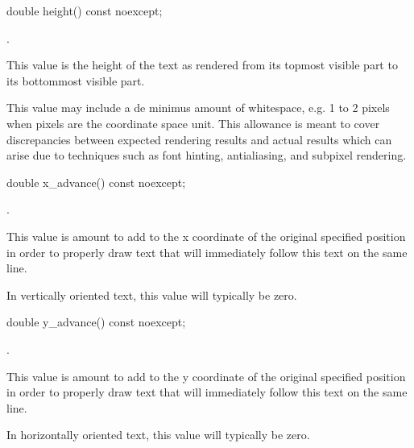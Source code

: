\begin{itemdecl}
    double height() const noexcept;
\end{itemdecl}
\begin{itemdescr}
	\pnum
	\returns
	.
	
	\pnum
	\remarks
	This value is the height of the text as rendered from its topmost visible part to its bottommost visible part.
	
	\pnum
	This value may include a de minimus amount of whitespace, e.g. 1 to 2 pixels when pixels are the coordinate space unit. This allowance is meant to cover discrepancies between expected rendering results and actual results which can arise due to techniques such as font hinting, antialiasing, and subpixel rendering.

\end{itemdescr}

\begin{itemdecl}
    double x_advance() const noexcept;
\end{itemdecl}
\begin{itemdescr}
	\pnum
	\returns
	.
	
	\pnum
	\remarks
	This value is amount to add to the x coordinate of the original specified position in order to properly draw text that will immediately follow this text on the same line.
	
	\pnum
	In vertically oriented text, this value will typically be zero.

\end{itemdescr}

\begin{itemdecl}
    double y_advance() const noexcept;
\end{itemdecl}
\begin{itemdescr}
	\pnum
	\returns
	.
	
	\pnum
	\remarks
	This value is amount to add to the y coordinate of the original specified position in order to properly draw text that will immediately follow this text on the same line.
	
	\pnum
	In horizontally oriented text, this value will typically be zero.

\end{itemdescr}

